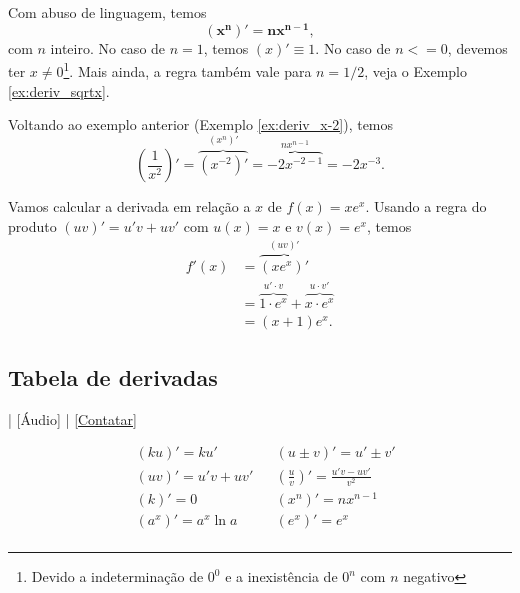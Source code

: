 \begin{obs}
  Com abuso de linguagem, temos
  \begin{equation}
    \pmb{(x^n)' = nx^{n-1}},
  \end{equation}
  com $n$ inteiro. No caso de $n=1$, temos $(x)' \equiv 1$. No caso de $n <= 0$, devemos ter $x\neq 0$\footnote{Devido a indeterminação de $0^0$ e a inexistência de $0^n$ com $n$ negativo}. Mais ainda, a regra também vale para $n=1/2$, veja o Exemplo \ref{ex:deriv_sqrtx}. 
\end{obs}

\begin{ex}
  Voltando ao exemplo anterior (Exemplo \ref{ex:deriv_x-2}), temos
  \begin{equation}
    \left(\frac{1}{x^2}\right)' = \overbrace{(x^{-2})'}^{(x^n)'} = \overbrace{-2x^{-2-1}}^{nx^{n-1}} = -2x^{-3}.
  \end{equation}
\end{ex}

\begin{ex}
  Vamos calcular a derivada em relação a $x$ de $f(x) = xe^x$. Usando a regra do produto $(uv)' = u'v + uv'$ com $u(x) = x$ e $v(x) = e^x$, temos
  \begin{align}
    f'(x) &= \overbrace{(xe^x)'}^{(uv)'}\\
          &= \overbrace{1\cdot e^x}^{u'\cdot v} + \overbrace{x\cdot e^x}^{u\cdot v'}\\
          &= (x + 1)e^x.
  \end{align}
\end{ex}

\subsection{Tabela de derivadas}

\begin{flushright}
  [Vídeo] | [Áudio] | \href{https://phkonzen.github.io/notas/contato.html}{[Contatar]}
\end{flushright}

\begin{align}
  &(ku)' = ku' && (u\pm v)' = u' \pm v'\\
  &(uv)' = u'v + uv' && \left(\frac{u}{v}\right)' = \frac{u'v - uv'}{v^2} \\
  &(k)' = 0 && (x^n)' = nx^{n-1}\\
  &(a^x)' = a^x\ln a && (e^x)' = e^x \\
\end{align}


